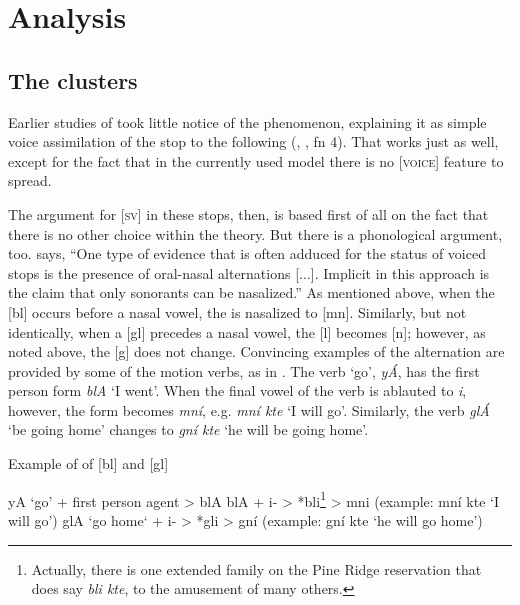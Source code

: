 \documentclass[output=paper]{LSP/langsci}
\begin{document}
\section{Analysis}

\subsection{The clusters}

Earlier studies of   took little notice of the  phenomenon, explaining it as simple voice assimilation of the stop to the following  (\citealt[37]{Carter1974}, \citealt[7]{Shaw1980}, \citealt[22]{Patterson1990} fn 4). That works just as well, except for the fact that in the currently used model there is no [\textsc{voice}] feature to spread.

The argument for [\textsc{sv}] in these stops, then, is based first of all on the fact that there is no other choice within the theory. But there is a phonological argument, too. \citet[180]{Botma2011} says, ``One type of evidence that is often adduced for the  status of voiced stops is the presence of oral-nasal alternations [...]. Implicit in this approach is the claim that only sonorants can be nasalized.'' As mentioned above, when the [bl]  occurs before a nasal vowel, the  is nasalized to [mn]. Similarly, but not identically, when a [gl]  precedes a nasal vowel, the [l] becomes [n]; however, as noted above, the [g] does not change. Convincing examples of the alternation are provided by some of the motion verbs, as in . The verb `go', \textit{y\'A}, has the first person form \textit{blA} `I went'. When the final vowel of the verb is ablauted to \textit{i}, however, the form becomes \textit{mn\'i}, e.g. \textit{mn\'i kte} `I will go'. Similarly, the verb \textit{gl\'A} `be going home' changes to \textit{gn\'i kte} `he will be going home'.

\begin{exe}\label{ex:rood:9}
\ex Example of  of [bl] and [gl]
\begin{xlist}
\ex yA `go' + first person agent > blA
\ex blA + i- > *bli\footnote{Actually, there is one extended family on the Pine Ridge reservation that does say \textit{bli kte}, to the amusement of many others.} > mni (example: mn\'i kte `I will go')
\ex glA `go home` + i- > *gli > gn\'i (example: gn\'i kte `he will go home')
\end{xlist}
\end{exe}
\end{document}
